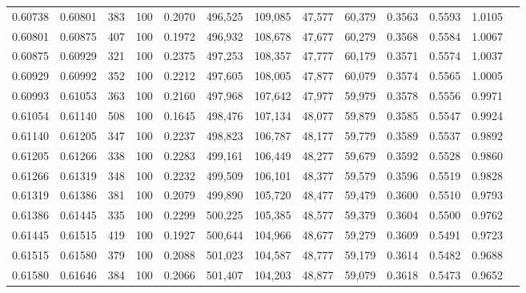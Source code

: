 \begin{tabular}{rrrrrrrrrrrrr}
0.60738 & 0.60801 &   383 & 100 &                                     0.2070 & 496,525 & 109,085 &  47,577 &  60,379 & 0.3563 & 0.5593 & 1.0105 \\
0.60801 & 0.60875 &   407 & 100 &                                     0.1972 & 496,932 & 108,678 &  47,677 &  60,279 & 0.3568 & 0.5584 & 1.0067 \\
0.60875 & 0.60929 &   321 & 100 &                                     0.2375 & 497,253 & 108,357 &  47,777 &  60,179 & 0.3571 & 0.5574 & 1.0037 \\
0.60929 & 0.60992 &   352 & 100 &                                     0.2212 & 497,605 & 108,005 &  47,877 &  60,079 & 0.3574 & 0.5565 & 1.0005 \\
0.60993 & 0.61053 &   363 & 100 &                                     0.2160 & 497,968 & 107,642 &  47,977 &  59,979 & 0.3578 & 0.5556 & 0.9971 \\
0.61054 & 0.61140 &   508 & 100 &                                     0.1645 & 498,476 & 107,134 &  48,077 &  59,879 & 0.3585 & 0.5547 & 0.9924 \\
0.61140 & 0.61205 &   347 & 100 &                                     0.2237 & 498,823 & 106,787 &  48,177 &  59,779 & 0.3589 & 0.5537 & 0.9892 \\
0.61205 & 0.61266 &   338 & 100 &                                     0.2283 & 499,161 & 106,449 &  48,277 &  59,679 & 0.3592 & 0.5528 & 0.9860 \\
0.61266 & 0.61319 &   348 & 100 &                                     0.2232 & 499,509 & 106,101 &  48,377 &  59,579 & 0.3596 & 0.5519 & 0.9828 \\
0.61319 & 0.61386 &   381 & 100 &                                     0.2079 & 499,890 & 105,720 &  48,477 &  59,479 & 0.3600 & 0.5510 & 0.9793 \\
0.61386 & 0.61445 &   335 & 100 &                                     0.2299 & 500,225 & 105,385 &  48,577 &  59,379 & 0.3604 & 0.5500 & 0.9762 \\
0.61445 & 0.61515 &   419 & 100 &                                     0.1927 & 500,644 & 104,966 &  48,677 &  59,279 & 0.3609 & 0.5491 & 0.9723 \\
0.61515 & 0.61580 &   379 & 100 &                                     0.2088 & 501,023 & 104,587 &  48,777 &  59,179 & 0.3614 & 0.5482 & 0.9688 \\
0.61580 & 0.61646 &   384 & 100 &                                     0.2066 & 501,407 & 104,203 &  48,877 &  59,079 & 0.3618 & 0.5473 & 0.9652 \\

\end{tabular}
